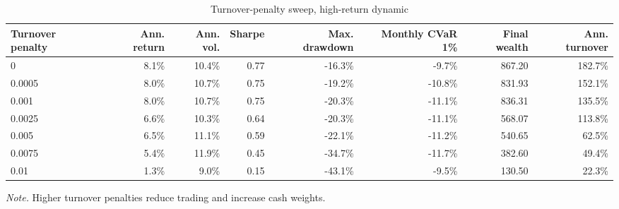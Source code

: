 ﻿\begin{table}[H]
\centering
\caption{Turnover-penalty sweep, high-return dynamic}
\label{tab:allocation-turnover-penalty-high-return}
\small
\begin{adjustbox}{max width=\linewidth}
\begin{tabular}{lrrrrrrr}
\toprule
Turnover penalty & Ann. return & Ann. vol. & Sharpe & Max. drawdown & Monthly CVaR 1\% & Final wealth & Ann. turnover \\
\midrule
0 & 8.1\% & 10.4\% & 0.77 & -16.3\% & -9.7\% & 867.20 & 182.7\% \\
0.0005 & 8.0\% & 10.7\% & 0.75 & -19.2\% & -10.8\% & 831.93 & 152.1\% \\
0.001 & 8.0\% & 10.7\% & 0.75 & -20.3\% & -11.1\% & 836.31 & 135.5\% \\
0.0025 & 6.6\% & 10.3\% & 0.64 & -20.3\% & -11.1\% & 568.07 & 113.8\% \\
0.005 & 6.5\% & 11.1\% & 0.59 & -22.1\% & -11.2\% & 540.65 & 62.5\% \\
0.0075 & 5.4\% & 11.9\% & 0.45 & -34.7\% & -11.7\% & 382.60 & 49.4\% \\
0.01 & 1.3\% & 9.0\% & 0.15 & -43.1\% & -9.5\% & 130.50 & 22.3\% \\
\bottomrule
\end{tabular}
\end{adjustbox}
\vspace{0.25em}
\begin{minipage}{0.92\linewidth}\footnotesize
\emph{Note.} Higher turnover penalties reduce trading and increase cash weights.
\end{minipage}
\end{table}



